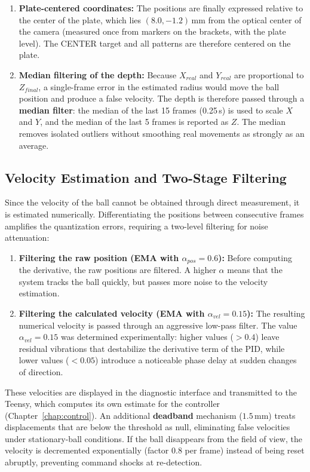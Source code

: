 \documentclass[12pt,a4paper]{report}
\begin{document}
\begin{enumerate}
    \item \textbf{Plate-centered coordinates:} The positions are finally expressed relative to the center of the plate, which lies $(8.0, -1.2)$\,mm from the optical center of the camera (measured once from markers on the brackets, with the plate level). The CENTER target and all patterns are therefore centered on the plate.

    \item \textbf{Median filtering of the depth:} Because $X_{real}$ and $Y_{real}$ are proportional to $Z_{final}$, a single-frame error in the estimated radius would move the ball position and produce a false velocity. The depth is therefore passed through a \textbf{median filter}: the median of the last 15 frames (0.25\,s) is used to scale $X$ and $Y$, and the median of the last 5 frames is reported as $Z$. The median removes isolated outliers without smoothing real movements as strongly as an average.
\end{enumerate}

\subsection{Velocity Estimation and Two-Stage Filtering}

Since the velocity of the ball cannot be obtained through direct measurement, it is estimated numerically. Differentiating the positions between consecutive frames amplifies the quantization errors, requiring a two-level filtering for noise attenuation:

\begin{enumerate}
    \item \textbf{Filtering the raw position (EMA with $\alpha_{pos} = 0.6$):} Before computing the derivative, the raw positions are filtered. A higher $\alpha$ means that the system tracks the ball quickly, but passes more noise to the velocity estimation.

    \item \textbf{Filtering the calculated velocity (EMA with $\alpha_{vel} = 0.15$):} The resulting numerical velocity is passed through an aggressive low-pass filter. The value $\alpha_{vel} = 0.15$ was determined experimentally: higher values ($> 0.4$) leave residual vibrations that destabilize the derivative term of the PID, while lower values ($< 0.05$) introduce a noticeable phase delay at sudden changes of direction.
\end{enumerate}

These velocities are displayed in the diagnostic interface and transmitted to the Teensy, which computes its own estimate for the controller (Chapter~\ref{chap:control}). An additional \textbf{deadband} mechanism ($1.5\,\text{mm}$) treats displacements that are below the threshold as null, eliminating false velocities under stationary-ball conditions. If the ball disappears from the field of view, the velocity is decremented exponentially (factor $0.8$ per frame) instead of being reset abruptly, preventing command shocks at re-detection.
\end{document}
